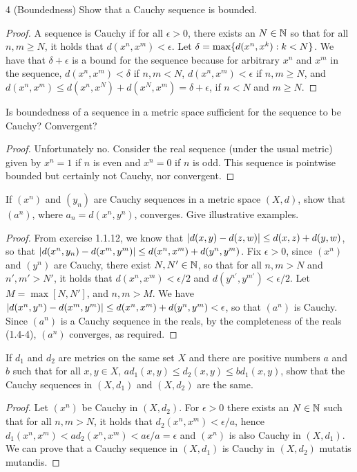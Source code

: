 \begin{exercise}{4 (Boundedness)}
Show that a Cauchy sequence is bounded.
\end{exercise}
\begin{proof}
A sequence is Cauchy if for all $\epsilon>0$, there exists an $N\in\mathbb{N}$ so that for all $n,m\geq N$, it holds that $d(x^n,x^m)<\epsilon$. Let $\delta=\max\{d(x^n,x^k):k<N\}$. We have that $\delta+\epsilon$ is a bound for the sequence because for arbitrary $x^n$ and $x^m$ in the sequence, $d(x^n,x^m)<\delta$ if $n,m<N$, $d(x^n,x^m)<\epsilon$ if $n,m\geq N$, and $d(x^n,x^m)\leq d(x^n,x^N)+d(x^N,x^m)=\delta+\epsilon$, if $n<N$ and $m\geq N$. 
\end{proof}

\begin{exercise}{5}
Is boundedness of a sequence in a metric space sufficient for the sequence to be Cauchy? Convergent?
\end{exercise}
\begin{proof}
Unfortunately no. Consider the real sequence (under the usual metric) given by $x^n=1$ if $n$ is even and $x^n=0$ if $n$ is odd. This sequence is pointwise bounded but certainly not Cauchy, nor convergent.
\end{proof}

\begin{exercise}{6}
If $(x^n)$ and $(y_n)$ are Cauchy sequences in a metric space $(X,d)$, show that $(a^n)$, where $a_n=d(x^n,y^n)$, converges. Give illustrative examples.
\end{exercise}
\begin{proof}
From exercise 1.1.12, we know that $\left\lvert d(x,y)-d(z,w)\right\rvert\leq d(x,z)+d(y,w)$, so that $\left\lvert d(x^n,y_n)-d(x^m,y^m)\right\rvert\leq d(x^n,x^m)+d(y^n,y^m)$. Fix $\epsilon>0$, since $(x^n)$ and $(y^n)$ are Cauchy, there exist $N,N'\in\mathbb{N}$, so that for all $n,m>N$ and $n',m'>N'$, it holds that $d(x^n,x^m)<\epsilon/2$ and $d(y^{n'},y^{m'})<\epsilon/2$. Let $M=\max[N,N']$, and $n,m>M$. We have $\left\lvert d(x^n,y^n)-d(x^m,y^m)\right\rvert\leq d(x^n,x^m)+d(y^n,y^m)<\epsilon$, so that $(a^n)$ is Cauchy. Since $(a^n)$ is a Cauchy sequence in the reals, by the completeness of the reals (1.4-4), $(a^n)$ converges, as required.
\end{proof}

\begin{exercise}{8}
If $d_1$ and $d_2$ are metrics on the same set $X$ and there are positive numbers $a$ and $b$ such that for all $x,y\in X$, $ad_1(x,y)\leq d_2(x,y)\leq bd_1(x,y)$, show that the Cauchy sequences in $(X,d_1)$ and $(X,d_2)$ are the same.
\end{exercise}
\begin{proof}
Let $(x^n)$ be Cauchy in $(X,d_2)$. For $\epsilon>0$ there exists an $N\in\mathbb{N}$ such that for all $n,m>N$, it holds that $d_2(x^n,x^m)<\epsilon/a$, hence $d_1(x^n,x^m)<ad_2(x^n,x^m)<a\epsilon/a=\epsilon$ and $(x^n)$ is also Cauchy in $(X,d_1)$. We can prove that a Cauchy sequence in $(X,d_1)$ is Cauchy in $(X,d_2)$ mutatis mutandis.
\end{proof}

